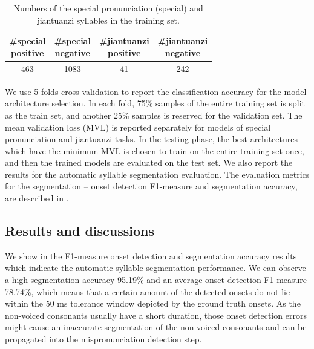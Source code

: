 \begin{table}[ht!]
\centering
\caption{Numbers of the special pronunciation (special) and jiantuanzi syllables in the training set.}
\label{tab:ch6:num_syllables_training_set}
\begin{tabular}{cccc}
\toprule
\makecell{\#special\\positive} & \makecell{\#special\\negative} & \makecell{\#jiantuanzi\\positive} & \makecell{\#jiantuanzi\\negative} \\
\midrule
463 & 1083 & 41 & 242 \\
\bottomrule
\end{tabular}
\end{table}

We use 5-folds cross-validation to report the classification accuracy for the model architecture selection. In each fold, 75\% samples of the entire training set is split as the train set, and another 25\% samples is reserved for the validation set. The mean validation loss (MVL) is reported separately for models of special pronunciation and jiantuanzi tasks. In the testing phase, the best architectures which have the minimum MVL is chosen to train on the entire training set once, and then the trained models are evaluated on the test set. We also report the results for the automatic syllable segmentation evaluation. The evaluation metrics for the segmentation -- onset detection F1-measure and segmentation accuracy, are described in . 

\subsection{Results and discussions}

We show in  the F1-measure onset detection and segmentation accuracy results which indicate the automatic syllable segmentation performance. We can observe a high segmentation accuracy 95.19\% and an average onset detection F1-measure 78.74\%, which means that a certain amount of the detected onsets do not lie within the 50 ms tolerance window depicted by the ground truth onsets. As the non-voiced consonants usually have a short duration, those onset detection errors might cause an inaccurate segmentation of the non-voiced consonants and can be propagated into the mispronunciation detection step. 

